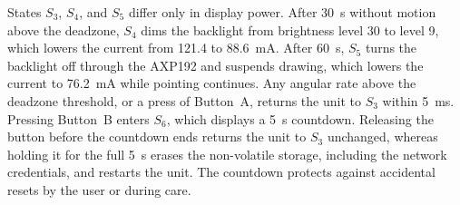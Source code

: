 \documentclass[journal]{IEEEtran}
\begin{document}
States $S_3$, $S_4$, and $S_5$ differ only in display power. After 30~s without motion above the deadzone, $S_4$ dims the backlight from brightness level 30 to level 9, which lowers the current from 121.4 to 88.6~mA. After 60~s, $S_5$ turns the backlight off through the AXP192 and suspends drawing, which lowers the current to 76.2~mA while pointing continues. Any angular rate above the deadzone threshold, or a press of Button~A, returns the unit to $S_3$ within 5~ms. Pressing Button~B enters $S_6$, which displays a 5~s countdown. Releasing the button before the countdown ends returns the unit to $S_3$ unchanged, whereas holding it for the full 5~s erases the non-volatile storage, including the network credentials, and restarts the unit. The countdown protects against accidental resets by the user or during care.

\end{document}
